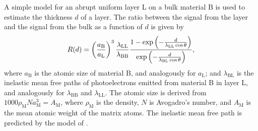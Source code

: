 A simple model for an abrupt uniform layer L on a bulk material B is used to estimate the thickness $d$ of a layer. The ratio between the signal from the layer and the signal from the bulk as a function of $d$ is given by \citet{briggs1990practical}
\begin{equation}\label{eq:signal_ratio}
    R(d) = \left( \frac{a_\mathrm{B}}{a_\mathrm{L}} \right)^3 \frac{\lambda_\mathrm{LL}}{\lambda_\mathrm{BB}} \frac{1-\exp{\left( -\frac{d}{\lambda_\mathrm{LL}\cos\theta} \right)}}{\exp{\left( -\frac{d}{\lambda_\mathrm{BL}\cos\theta} \right)}},
\end{equation}
where $a_\mathrm{B}$ is the atomic size of material B, and analogously for $a_\mathrm{L}$; and $\lambda_\mathrm{BL}$ is the inelastic mean free paths of photoelectrons emitted from material B in layer L, and analogously for $\lambda_\mathrm{BB}$ and $\lambda_\mathrm{LL}$. The atomic size is derived from $1000\rho_\mathrm{M}N a_\mathrm{M}^3 = A_\mathrm{M}$, where $\rho_\mathrm{M}$ is the density, $N$ is Avogadro's number, and $A_\mathrm{M}$ is the mean atomic weight of the matrix atoms. The inelastic mean free path is predicted by the model of \citet{tanuma1991calculations}.




